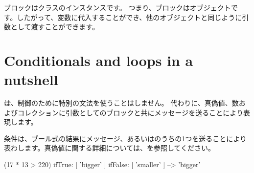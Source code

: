 \documentclass[a4paper,10pt,twoside]{book}
\begin{document}
ブロックはクラスのインスタンスです。
つまり、ブロックはオブジェクトです。したがって、変数に代入することができ、他のオブジェクトと同じように引数として渡すことができます。






\section{Conditionals and loops in a nutshell}

\st は、制御のために特別の文法を使うことはしません。
代わりに、真偽値、数およびコレクションに引数としてのブロックと共にメッセージを送ることにより表現します。

条件は、ブール式の結果にメッセージ、あるいはのうちの1つを送ることにより表わします。真偽値に関する詳細については、を参照してください。

\begin{code}{}
(17 * 13 > 220)
   ifTrue: [ 'bigger' ]
   ifFalse: [ 'smaller' ] --> 'bigger'
\end{code}
\end{document}
